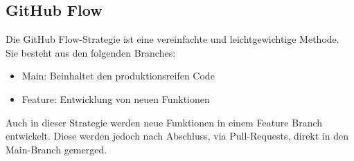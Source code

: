 \subsection{GitHub Flow}
\label{sec:GitHubFlow}
Die GitHub Flow-Strategie ist eine vereinfachte und leichtgewichtige Methode. Sie besteht aus den folgenden Branches:
\begin{itemize}
    \item Main: Beinhaltet den produktionsreifen Code  
    \item Feature: Entwicklung von neuen Funktionen
\end{itemize}
Auch in dieser Strategie werden neue Funktionen in einem Feature Branch entwickelt. Diese werden jedoch nach Abschluss, via Pull-Requests, direkt in den Main-Branch gemerged.
\parencite{priyanka_gowdaashwath_narayana_gowda_git-branching-and-release-strategies_2022}



